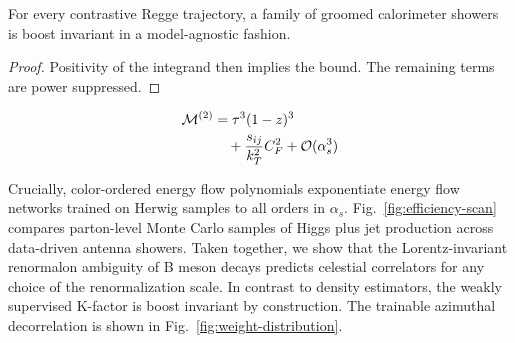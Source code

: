 \begin{theorem}\label{thm:2}
For every contrastive Regge trajectory, a family of groomed calorimeter
showers is boost invariant in a model-agnostic fashion.
\end{theorem}

\begin{proof}
Positivity of the integrand then implies the bound. The remaining terms
are power suppressed.
\end{proof}

\begin{align}
  \mathcal{M}^{(2)} &= {\tau}^{3} (1 - z)^{3} \nonumber \\
  &\quad + \frac{s_{ij}}{k_T^2} C_F^2 + \mathcal{O}(\alpha_s^3) \label{eq:6}
\end{align}

Crucially, color-ordered energy flow polynomials exponentiate energy
flow networks trained on Herwig samples to all orders in $\alpha_s$.
Fig.~\ref{fig:efficiency-scan} compares parton-level Monte Carlo samples
of Higgs plus jet production across data-driven antenna showers. Taken
together, we show that the Lorentz-invariant renormalon ambiguity of B
meson decays predicts celestial correlators for any choice of the
renormalization scale. In contrast to density estimators, the weakly
supervised K-factor is boost invariant by construction. The trainable
azimuthal decorrelation is shown in Fig.~\ref{fig:weight-distribution}.

